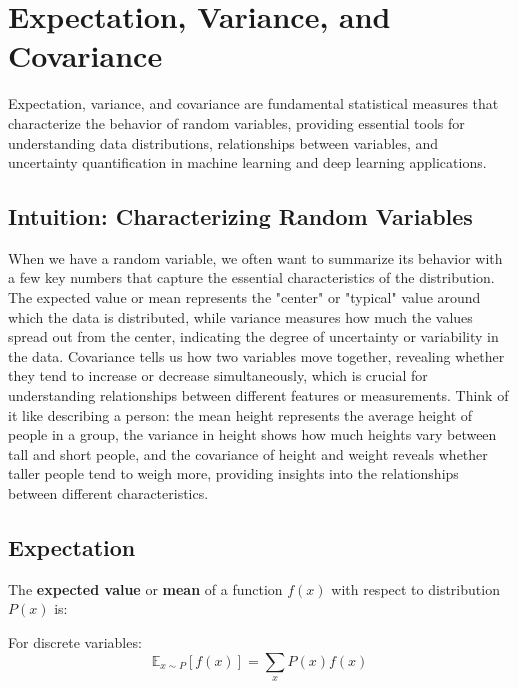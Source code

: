 
\section{Expectation, Variance, and Covariance }
\label{sec:expectation-variance}

Expectation, variance, and covariance are fundamental statistical measures that characterize the behavior of random variables, providing essential tools for understanding data distributions, relationships between variables, and uncertainty quantification in machine learning and deep learning applications.

\subsection{Intuition: Characterizing Random Variables}

When we have a random variable, we often want to summarize its behavior with a few key numbers that capture the essential characteristics of the distribution. The expected value or mean represents the "center" or "typical" value around which the data is distributed, while variance measures how much the values spread out from the center, indicating the degree of uncertainty or variability in the data. Covariance tells us how two variables move together, revealing whether they tend to increase or decrease simultaneously, which is crucial for understanding relationships between different features or measurements. Think of it like describing a person: the mean height represents the average height of people in a group, the variance in height shows how much heights vary between tall and short people, and the covariance of height and weight reveals whether taller people tend to weigh more, providing insights into the relationships between different characteristics.

\subsection{Expectation}

The \textbf{expected value} or \textbf{mean} of a function $f(x)$ with respect to distribution $P(x)$ is:

For discrete variables:
\begin{equation}
\mathbb{E}_{x \sim P}[f(x)] = \sum_{x} P(x) f(x)
\end{equation}

